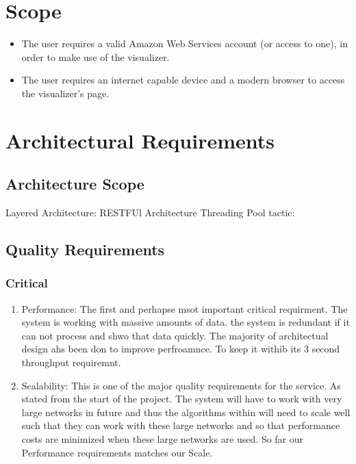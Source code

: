 \documentclass[hidelinks,a4paper,12pt]{article}
\begin{document}
\section{Scope}
\begin {itemize}
	\item The user requires a valid Amazon Web Services account (or access to one), in order to make use of the visualizer.
	\item The user requires an internet capable device and a modern browser to access the visualizer's page.
\end{itemize}
\newpage

\section{Architectural Requirements}

	\subsection{Architecture Scope}
	Layered Architecture: 
	RESTFUl Architecture
	Threading Pool tactic:
	
	

	\subsection{Quality Requirements}
		\subsubsection {Critical}
\begin{enumerate}  
					\item Performance: The first and perhapse msot important critical requirment. The system is working with massive amounts of data. the system is redundant if it can not process and shwo that data quickly. The majority of architectual design ahs been don to improve perfroamnce. To keep it withib its 3 second throughput requiremnt. 
					\item Scalability: This is one of the major quality requirements for the service. As stated from the start of the project. The system will have to work with very large networks in future and thus the algorithms within will need to scale well such that they can work with these large networks and so that performance costs are minimized when these large networks are used. So far our Performance requirements matches our Scale.
\end{enumerate}		
\end{document}
